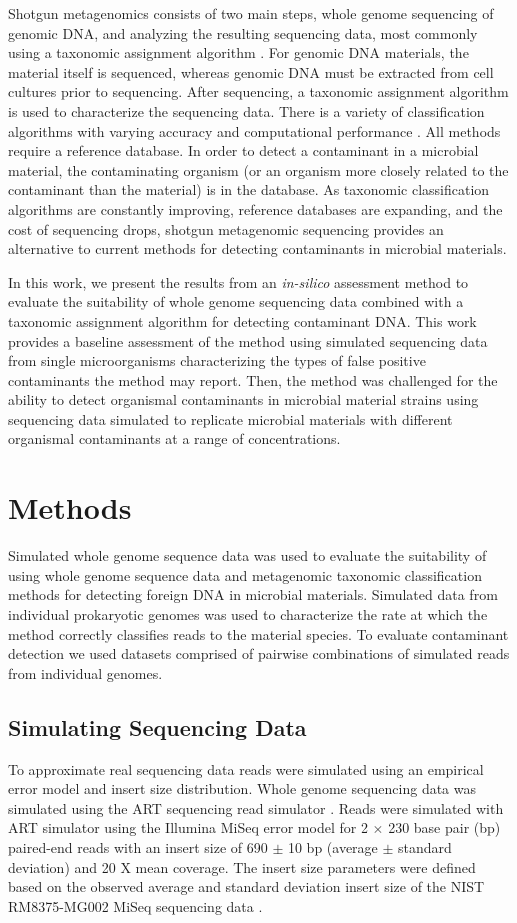 \documentclass[fleqn,10pt,lineno]{wlpeerj}\usepackage[]{graphicx}\usepackage[]{color}
\begin{document}
Shotgun metagenomics consists of two main steps, whole genome sequencing of genomic DNA, and analyzing the resulting sequencing data, most commonly using a taxonomic assignment algorithm \citep{Thomas2012}. 
For genomic DNA materials, the material itself is sequenced, whereas genomic DNA must be extracted from cell cultures prior to sequencing. 
After sequencing, a taxonomic assignment algorithm is used to characterize the sequencing data. 
There is a variety of classification algorithms with varying accuracy and computational performance \citep{Bazinet2012,menzel2016fast}.
All methods require a reference database.
In order to detect a contaminant in a microbial material, the contaminating organism (or an organism more closely related to the contaminant than the material) is in the database. 
As taxonomic classification algorithms are constantly improving, reference databases are expanding, and the cost of sequencing drops, shotgun metagenomic sequencing provides an alternative to current methods for detecting contaminants in microbial materials.

In this work, we present the results from an \textit{in-silico} assessment method to evaluate the suitability of whole genome sequencing data combined with a taxonomic assignment algorithm for detecting contaminant DNA.
This work provides a baseline assessment of the method using simulated sequencing data from single microorganisms characterizing the types of false positive contaminants the method may report.
Then, the method was challenged for the ability to detect organismal contaminants in microbial material strains using sequencing data simulated to replicate microbial materials with different organismal contaminants at a range of concentrations.

\section*{Methods}
Simulated whole genome sequence data was used to evaluate the suitability of using whole genome sequence data and metagenomic taxonomic classification methods for detecting foreign DNA in microbial materials.
Simulated data from individual prokaryotic genomes was used to characterize the rate at which the method correctly classifies reads to the material species.
To evaluate contaminant detection we used datasets comprised of pairwise combinations of simulated reads from individual genomes.  

\subsection*{Simulating Sequencing Data}
To approximate real sequencing data reads were simulated using an empirical error model and insert size distribution.
Whole genome sequencing data was simulated using the ART sequencing read simulator \citep{Huang2012}.
Reads were simulated with ART simulator using the Illumina MiSeq error model for 2 $\times$ 230 base pair (bp) paired-end reads with an insert size of 690 $\pm$ 10 bp (average $\pm$ standard deviation) and 20 X mean coverage.
The insert size parameters were defined based on the observed average and standard deviation insert size of the NIST RM8375-MG002 MiSeq sequencing data \citep{olson2016pepr}.
\end{document}

